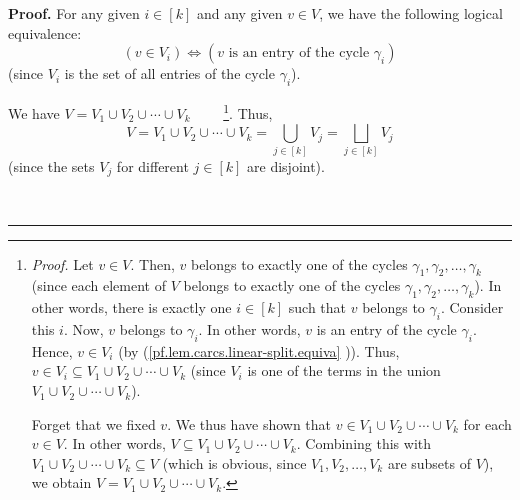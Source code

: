 \documentclass[numbers=enddot,12pt,final,onecolumn,notitlepage]{scrartcl}%
\numberwithin{exer}{section}
\theoremstyle{definition}
\newenvironment{proof}[1][Proof]{\noindent\textbf{#1.} }{\ \rule{0.5em}{0.5em}}
\let\cupnonlimits\bigcup
\let\sqcupnonlimits\bigsqcup
\renewcommand{\bigcup}{\cupnonlimits\limits}
\renewcommand{\bigsqcup}{\sqcupnonlimits\limits}
\newenvironment{verlong}{}{}
\begin{document}
\begin{verlong}
\begin{proof}
For any given $i\in\left[  k\right]  $ and any given $v\in V$, we have the
following logical equivalence:%
\begin{equation}
\left(  v\in V_{i}\right)  \Longleftrightarrow\left(  v\text{ is an entry of
the cycle }\gamma_{i}\right)  \label{pf.lem.carcs.linear-split.equiva}%
\end{equation}
(since $V_{i}$ is the set of all entries of the cycle $\gamma_{i}$).

We have $V=V_{1}\cup V_{2}\cup\cdots\cup V_{k}$%
\ \ \ \ \footnote{\textit{Proof.} Let $v\in V$. Then, $v$ belongs to exactly
one of the cycles $\gamma_{1},\gamma_{2},\ldots,\gamma_{k}$ (since each
element of $V$ belongs to exactly one of the cycles $\gamma_{1},\gamma
_{2},\ldots,\gamma_{k}$). In other words, there is exactly one $i\in\left[
k\right]  $ such that $v$ belongs to $\gamma_{i}$. Consider this $i$. Now, $v$
belongs to $\gamma_{i}$. In other words, $v$ is an entry of the cycle
$\gamma_{i}$. Hence, $v\in V_{i}$ (by (\ref{pf.lem.carcs.linear-split.equiva}%
)). Thus, $v\in V_{i}\subseteq V_{1}\cup V_{2}\cup\cdots\cup V_{k}$ (since
$V_{i}$ is one of the terms in the union $V_{1}\cup V_{2}\cup\cdots\cup V_{k}%
$).
\par
Forget that we fixed $v$. We thus have shown that $v\in V_{1}\cup V_{2}%
\cup\cdots\cup V_{k}$ for each $v\in V$. In other words, $V\subseteq V_{1}\cup
V_{2}\cup\cdots\cup V_{k}$. Combining this with $V_{1}\cup V_{2}\cup\cdots\cup
V_{k}\subseteq V$ (which is obvious, since $V_{1},V_{2},\ldots,V_{k}$ are
subsets of $V$), we obtain $V=V_{1}\cup V_{2}\cup\cdots\cup V_{k}$.}. Thus,%
\[
V=V_{1}\cup V_{2}\cup\cdots\cup V_{k}=\bigcup_{j\in\left[  k\right]  }%
V_{j}=\bigsqcup_{j\in\left[  k\right]  }V_{j}%
\]
(since the sets $V_{j}$ for different $j\in\left[  k\right]  $ are disjoint).


\end{proof}
\end{verlong}
\end{document}
